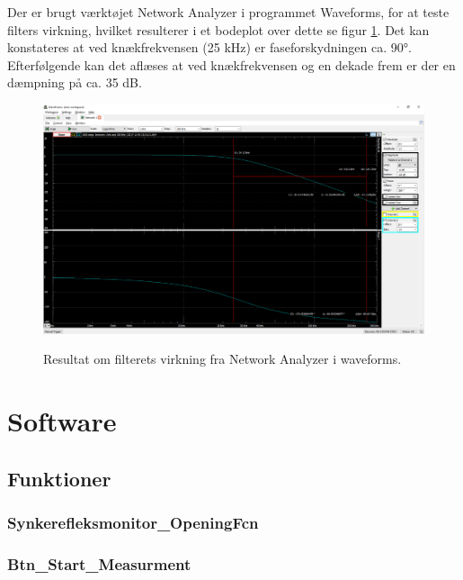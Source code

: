 Der er brugt værktøjet Network Analyzer i programmet Waveforms, for at teste filters virkning, hvilket resulterer i et bodeplot over dette se figur \ref{fig:aafiltermodultest}. Det kan konstateres at ved knækfrekvensen (25 kHz) er faseforskydningen ca. \ang{90}. Efterfølgende kan det aflæses at ved knækfrekvensen og en dekade frem er der en dæmpning på ca. 35 dB.



\begin{figure}[H] 
\centering
{\includegraphics[width=\linewidth]
{Figure/aafiltermodultest}}
\caption{Resultat om filterets virkning fra Network Analyzer i waveforms.}
\label{fig:aafiltermodultest}
\end{figure}





\section{Software}

\subsection{Funktioner}
\subsubsection{Synkerefleksmonitor\_OpeningFcn}





\subsubsection{Btn\_Start\_Measurment}



